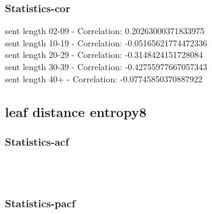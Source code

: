 \documentclass{article}%
\begin{document}
%
\newpage%
\subsubsection{Statistics{-}cor}%
\label{ssubsec:Statistics{-}cor}%
\noindent%
sent length 02-09 - Correlation: 0.20263000371833975\\%
sent length 10-19 - Correlation: -0.05165621774472336\\%
sent length 20-29 - Correlation: -0.3148424151728084\\%
sent length 30-39 - Correlation: -0.42755977667057343\\%
sent length 40+ - Correlation: -0.07745850370887922\\

%
\newpage

%
\subsection{leaf distance entropy8}%
\label{subsec:leafdistanceentropy8}%
\subsubsection{Statistics{-}acf}%
\label{ssubsec:Statistics{-}acf}%


\begin{figure}[ht]%
\centering%
\setlength{\abovecaptionskip}{-35pt}%
%
%
\\%
%
%
\\%
%
\end{figure}

%
\newpage%
\subsubsection{Statistics{-}pacf}%
\label{ssubsec:Statistics{-}pacf}%
\end{document}
